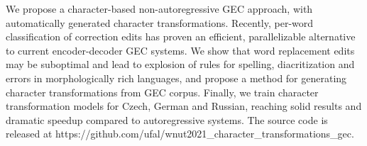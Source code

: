 We propose a character-based non-autoregressive GEC approach, with automatically generated character transformations. Recently, per-word classification of correction edits has proven an efficient, parallelizable alternative to current encoder-decoder GEC systems. We show that word replacement edits may be suboptimal and lead to explosion of rules for spelling, diacritization and errors in morphologically rich languages, and propose a method for generating character transformations from GEC corpus. Finally, we train character transformation models for Czech, German and Russian, reaching solid results and dramatic speedup compared to autoregressive systems. The source code is released at https://github.com/ufal/wnut2021\_character\_transformations\_gec.
